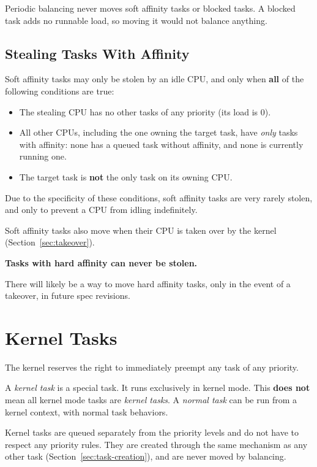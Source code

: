 \documentclass[11pt]{article}
\begin{document}
Periodic balancing never moves soft affinity tasks or blocked tasks. A blocked task adds no runnable load, so moving it would not balance anything.

\subsection{Stealing Tasks With Affinity}
\label{sec:stealing-affinity}

Soft affinity tasks may only be stolen by an idle CPU, and only when \textbf{all} of the following conditions are true:

\begin{itemize}
	\item The stealing CPU has no other tasks of any priority (its load is 0).
	\item All other CPUs, including the one owning the target task, have \textit{only} tasks with affinity: none has a queued task without affinity, and none is currently running one.
	\item The target task is \textbf{not} the only task on its owning CPU.
\end{itemize}

Due to the specificity of these conditions, soft affinity tasks are very rarely stolen, and only to prevent a CPU from idling indefinitely.

Soft affinity tasks also move when their CPU is taken over by the kernel (Section~\ref{sec:takeover}).

\textbf{Tasks with hard affinity can never be stolen.}

\begin{specnote}
	There will likely be a way to move hard affinity tasks, only in the event of a takeover, in future spec revisions.
\end{specnote}

\section{Kernel Tasks}
\label{sec:kernel-tasks}

The kernel reserves the right to immediately preempt any task of any priority.

A \textit{kernel task} is a special task. It runs exclusively in kernel mode.
This \textbf{does not} mean all kernel mode tasks are \textit{kernel tasks}.
A \textit{normal task} can be run from a kernel context, with normal task behaviors.

Kernel tasks are queued separately from the priority levels and do not have to respect any priority rules.
They are created through the same mechanism as any other task (Section~\ref{sec:task-creation}), and are never moved by balancing.
\end{document}
